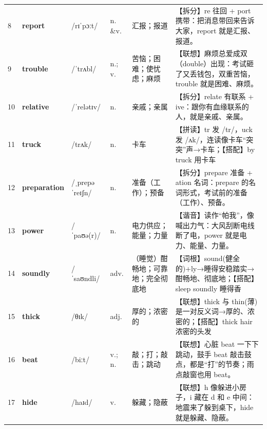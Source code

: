 \documentclass[UTF8,a4paper,11pt,oneside]{ctexbook}
\newcommand{\cellword}[1]{{\bfseries\textcolor{wordcol}{#1}}}
\newcommand{\cellipa}[1]{{\footnotesize\textcolor{ipacol}{#1}}}
\newcommand{\cellpos}[1]{\textcolor{poscol}{#1}}
\newcommand{\cellno}[1]{\textcolor{volcolor!75!black}{#1}}
\begin{document}
{\begin{longtable}{@{}C{0.045\textwidth}L{0.155\textwidth}L{0.175\textwidth}C{0.070\textwidth}L{0.180\textwidth}L{0.282\textwidth}@{}}
\cellno{8} & \cellword{report} & \cellipa{/rɪˈpɔːt/} & \cellpos{n. \&v.} & 汇报；报道 & \textcolor{tagSplit}{【拆分】}re 往回 + port 携带：把消息带回来告诉大家，report 就是汇报、报道。 \\
 \cellno{9} & \cellword{trouble} & \cellipa{/ˈtrʌbl/} & \cellpos{n.;\allowbreak{} v.} & 苦恼；困难；使忧虑；麻烦 & \textcolor{tagAssoc}{【联想】}麻烦总爱成双（double）出现：考试砸了又丢钱包，双重苦恼，trouble 就是困难、麻烦。 \\
\cellno{10} & \cellword{relative} & \cellipa{/ˈrelətɪv/} & \cellpos{n.} & 亲戚；亲属 & \textcolor{tagSplit}{【拆分】}relate 有联系 + ive：跟你有血缘联系的人，就是亲戚、亲属。 \\
 \cellno{11} & \cellword{truck} & \cellipa{/trʌk/} & \cellpos{n.} & 卡车 & \textcolor{tagSpell}{【拼读】}tr 发 /tr/，uck 发 /ʌk/，连读像卡车“突突”声→\allowbreak{}卡车；\textcolor{tagColloc}{【搭配】}by truck 用卡车 \\
\cellno{12} & \cellword{preparation} & \cellipa{/ˌprepəˈreɪʃn/} & \cellpos{n.} & 准备（工作）；预备 & \textcolor{tagSplit}{【拆分】}prepare 准备 + ation 名词：prepare 的名词形式，考试前的准备（工作）、预备。 \\
 \cellno{13} & \cellword{power} & \cellipa{/ˈpaʊə(r)/} & \cellpos{n.} & 电力供应；能量；力量 & \textcolor{tagSound}{【谐音】}读作“帕我”，像喊出力气：大风刮断电线断了电，power 就是电力、能量、力量。 \\
\cellno{14} & \cellword{soundly} & \cellipa{/ˈsaʊndli/} & \cellpos{adv.} & （睡觉）酣畅地；可靠地；完全彻底地 & \textcolor{tagRoot}{【词根】}sound(健全的)+ly→\allowbreak{}睡得安稳踏实→\allowbreak{}酣畅地、彻底地；\textcolor{tagColloc}{【搭配】}sleep soundly 睡得香 \\
 \cellno{15} & \cellword{thick} & \cellipa{/θɪk/} & \cellpos{adj.} & 厚的；浓密的 & \textcolor{tagAssoc}{【联想】}thick 与 thin(薄)是一对反义词→\allowbreak{}厚的、浓密的；\textcolor{tagColloc}{【搭配】}thick hair 浓密的头发 \\
\cellno{16} & \cellword{beat} & \cellipa{/biːt/} & \cellpos{v.;\allowbreak{} n.} & 敲；打；敲击；跳动 & \textcolor{tagAssoc}{【联想】}心脏 beat 一下下跳动，鼓手 beat 敲击鼓点，都是“打”的节奏；雨点敲窗也用 beat。 \\
 \cellno{17} & \cellword{hide} & \cellipa{/haɪd/} & \cellpos{v.} & 躲藏；隐蔽 & \textcolor{tagAssoc}{【联想】}h 像躲进小房子，i 藏在 d 和 e 中间：地震来了躲到桌下，hide 就是躲藏、隐蔽。 \\

\end{longtable}}
\end{document}
